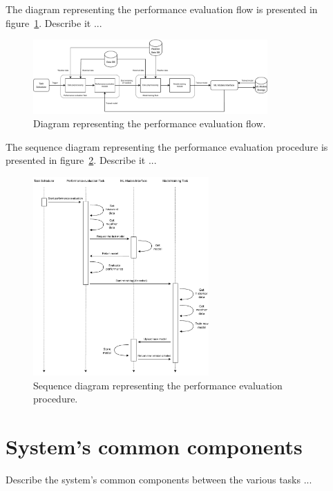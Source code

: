 The diagram representing the performance evaluation flow is presented in figure~\ref{fig:schedulerflow}.
Describe it ...

\begin{figure}[H]
\centering
\includegraphics[width=0.8\textwidth]{images/architecture_scheduler_flow}
\caption{Diagram representing the performance evaluation flow.}
\label{fig:schedulerflow}
\end{figure}

The sequence diagram representing the performance evaluation procedure is presented in figure~\ref{fig:schedulersequence}.
Describe it ...

\begin{figure}[H]
\centering
\includegraphics[width=0.6\textwidth]{images/architecture_scheduler_sequence}
\caption{Sequence diagram representing the performance evaluation procedure.}
\label{fig:schedulersequence}
\end{figure}


\section{System's common components}
\label{sec:components}
\vspace{0.2 cm}

Describe the system's common components between the various tasks ...

